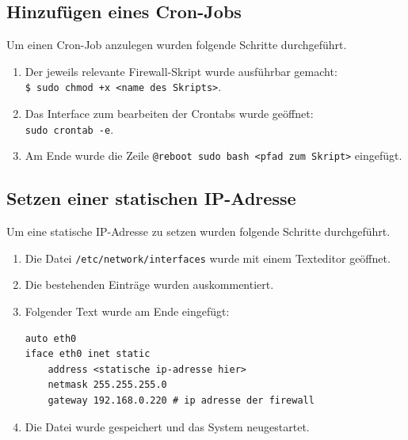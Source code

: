 \documentclass[
    a4paper,
    pagesize,
	pdftex,
    12pt,
]{scrartcl}
\begin{document}
\subsection{Hinzufügen eines Cron-Jobs}\label{cron-job}
Um einen Cron-Job anzulegen wurden folgende Schritte durchgeführt.
\begin{enumerate}
	\item Der jeweils relevante Firewall-Skript wurde ausführbar gemacht: \\ \lstinline[breaklines]|$ sudo chmod +x <name des Skripts>|.
	\item Das Interface zum bearbeiten der Crontabs wurde geöffnet: \\ \lstinline[breaklines]|sudo crontab -e|.
	\item Am Ende wurde die Zeile \lstinline[breaklines]|@reboot sudo bash <pfad zum Skript>| eingefügt.
\end{enumerate}

\subsection{Setzen einer statischen IP-Adresse}\label{static-ip}
Um eine statische IP-Adresse zu setzen wurden folgende Schritte durchgeführt.
\begin{enumerate}
	\item Die Datei \lstinline[breaklines]|/etc/network/interfaces| wurde mit einem Texteditor geöffnet.
	\item Die bestehenden Einträge wurden auskommentiert.
	\item Folgender Text wurde am Ende eingefügt:
	\begin{lstlisting}[breaklines]
auto eth0
iface eth0 inet static
	address <statische ip-adresse hier>
	netmask 255.255.255.0
	gateway 192.168.0.220 # ip adresse der firewall
	\end{lstlisting}
	\item Die Datei wurde gespeichert und das System neugestartet.
\end{enumerate}

\newpage


\end{document}
